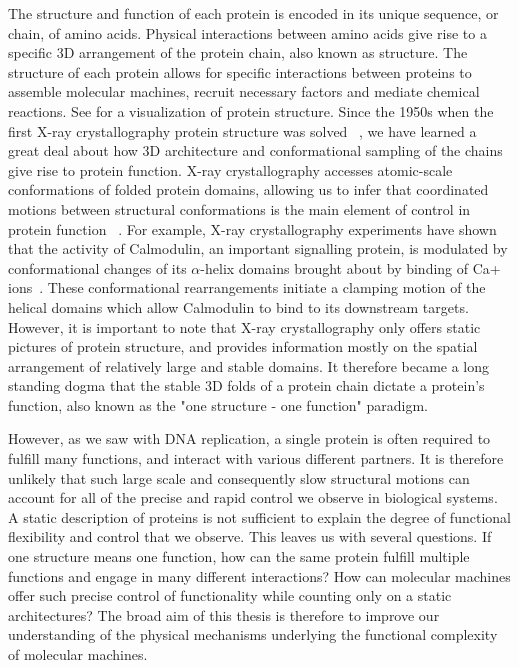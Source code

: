 The structure and function of each protein is encoded in its unique sequence, or chain, of amino acids. Physical interactions between amino acids give rise to a specific 3D arrangement of the protein chain, also known as structure. The structure of each protein allows for specific interactions between  proteins  to  assemble molecular machines, recruit  necessary factors and mediate chemical reactions. See  for a visualization of protein structure. Since the 1950s when the first X-ray crystallography protein structure was solved ~\cite{kendrew1958three}, we have learned a great deal about how 3D architecture and conformational sampling of the chains give rise to protein function. X-ray crystallography accesses atomic-scale conformations of folded protein  domains, allowing us to infer that  coordinated  motions between structural conformations is the main element of control in protein function ~\cite{hegyi1999relationship}. For example, X-ray crystallography experiments have shown that the activity of Calmodulin, an important signalling protein, is modulated by conformational changes of its $\alpha$-helix domains brought about by binding of Ca+ ions~\cite{meador1992target}. These conformational rearrangements initiate a clamping motion of the helical domains which allow Calmodulin to bind to its downstream targets. However, it is important to note that X-ray crystallography only offers static pictures of protein structure, and provides information mostly on the spatial arrangement of relatively large and stable domains. It therefore became a long standing dogma that the stable 3D folds of a protein chain dictate a protein's function, also known as the "one structure - one function" paradigm. 

However, as we saw with DNA replication, a single protein is often required to fulfill many functions, and interact with various different partners. It is therefore unlikely that such large scale and consequently slow structural motions can account for all of the precise and rapid control we observe in biological systems. A static description of proteins is not sufficient to explain the degree of functional flexibility and control that we observe. This leaves us with several questions. If one structure means one function, how can the same protein fulfill multiple functions and engage in many different interactions? How can molecular machines offer such precise control of functionality while counting only on a static architectures? The broad aim of this thesis is therefore to improve our understanding of the physical mechanisms underlying the functional complexity of molecular machines.

